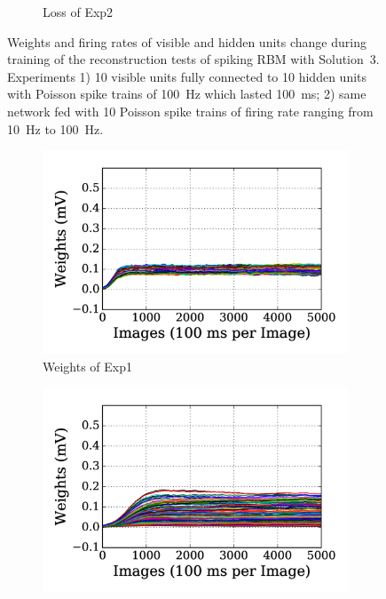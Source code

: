 \begin{figure}
\begin{subfigure}[t]{0.48\textwidth}
		\caption{Loss of Exp2}
	\end{subfigure}
	\caption[SRBM-S3 training of the reconstruction tests.]{Weights and firing rates of visible and hidden units change during training of the reconstruction tests of spiking RBM with Solution~3. 
		Experiments 1) 10 visible units fully connected to 10 hidden units with Poisson spike trains of 100~Hz which lasted 100~ms; 2) same network fed with 10 Poisson spike trains of firing rate ranging from 10~Hz to 100~Hz.}
	\label{fig:sol3_rbm}
\end{figure}

\begin{figure}
	\centering
	\begin{subfigure}[t]{0.48\textwidth}
		\includegraphics[width=\textwidth]{pics_sdlm/07_exp_SAE_all_long/exp1_weights_s.png}
		\caption{Weights of Exp1}
	\end{subfigure}
	\begin{subfigure}[t]{0.48\textwidth}
		\includegraphics[width=\textwidth]{pics_sdlm/07_exp_SAE_all_long/exp2_weights_s.png}

\end{subfigure}
\end{figure}
